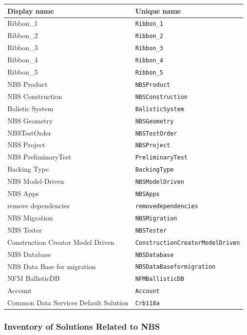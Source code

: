\begin{small}
	\begin{tabularx}{\textwidth}{l|l}
		\textbf{Display name} & \textbf{Unique name} \\
		\hline
		Ribbon\_1 & \texttt{Ribbon\_1} \\
		Ribbon\_2 & \texttt{Ribbon\_2} \\
		Ribbon\_3 & \texttt{Ribbon\_3} \\
		Ribbon\_4 & \texttt{Ribbon\_4} \\
		Ribbon\_5 & \texttt{Ribbon\_5} \\
		NBS Product & \texttt{NBSProduct} \\
		NBS Construction & \texttt{NBSConstruction} \\
		Balistic System & \texttt{BalisticSystem} \\
		NBS Geometry & \texttt{NBSGeometry} \\
		NBSTestOrder & \texttt{NBSTestOrder} \\
		NBS Project & \texttt{NBSProject} \\
		NBS PreliminaryTest & \texttt{PreliminaryTest} \\
		Backing Type & \texttt{BackingType} \\
		NBS Model-Driven & \texttt{NBSModelDriven} \\
		NBS Apps & \texttt{NBSApps} \\
		remove dependencies & \texttt{removedependencies} \\
		NBS Migration & \texttt{NBSMigration} \\
		NBS Tester & \texttt{NBSTester} \\
		Construction Creator Model Driven & \texttt{ConstructionCreatorModelDriven} \\
		NBS Database & \texttt{NBSDatabase} \\
		NBS Data Base for migration & \texttt{NBSDataBaseformigration} \\
		NFM BallisticDB & \texttt{NFMBallisticDB} \\
		Account & \texttt{Account} \\
		Common Data Services Default Solution & \texttt{Crb118a} \\
	\end{tabularx}
\end{small}

\subsubsection{Inventory of Solutions Related to NBS}


